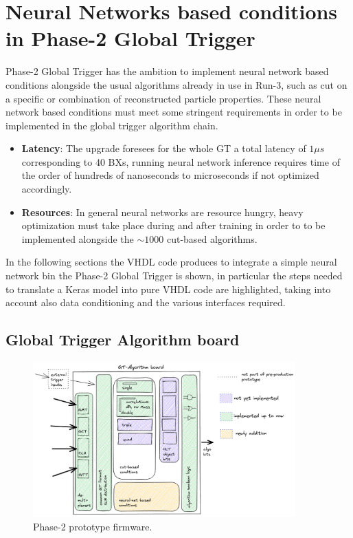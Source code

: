\documentclass[../../main.tex]{subfiles}
\begin{document}
\chapter{Neural Networks based conditions in Phase-2 Global Trigger}
\label{sec:P2GT}

Phase-2 Global Trigger has the ambition to implement neural network based conditions alongside the usual algorithms already in use in Run-3, such as cut on a specific or combination of reconstructed particle properties. These neural network based conditions must meet some stringent requirements in order to be implemented in the global trigger algorithm chain.  
\begin{itemize}
    \item \textbf{Latency}: The upgrade foresees for the whole GT a total latency of $1\mu s$ corresponding to 40 BXs, running neural network inference requires time of the order of hundreds of nanoseconds to microseconds if not optimized accordingly.
    \item \textbf{Resources}: In general neural networks are resource hungry, heavy optimization must take place during and after training in order to to be implemented alongside the  $\sim1000$ cut-based algorithms.  
\end{itemize}

In the following sections the VHDL code produces to integrate a simple neural network bin the Phase-2 Global Trigger is shown, in particular the steps needed to translate a Keras model into pure VHDL code are highlighted, taking into account also data conditioning and the various interfaces required.

\section{Global Trigger Algorithm board}
\label{sec:Gt-algo-board}

\begin{figure}[h]
    \centering
    \includegraphics[width=0.90\textwidth]{sections/05/Images/GT-algo.png}
    \caption{Phase-2 prototype firmware.}
    \label{fig:P2GT}
\end{figure}  
\end{document}
